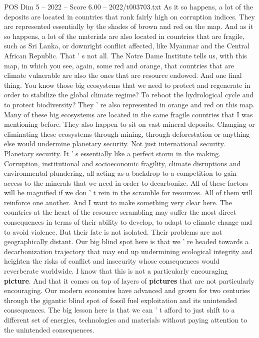 \begin{textsample}{POS Dim 5 – 2022 – Score 6.00 – 2022/t003703.txt}
As it so happens, a lot of the deposits are located in countries that rank fairly high on corruption indices.
They are represented essentially by the shades of brown and red on the map.
And as it so happens, a lot of the materials are also located in countries that are fragile, such as Sri Lanka, or downright conflict affected, like Myanmar and the Central African Republic.
That ' s not all.
The Notre Dame Institute tells us, with this map, in which you see, again, some red and orange, that countries that are climate vulnerable are also the ones that are resource endowed.
And one final thing.
You know those big ecosystems that we need to protect and regenerate in order to stabilize the global climate regime?
To reboot the hydrological cycle and to protect biodiversity?
They ' re also represented in orange and red on this map.
Many of these big ecosystems are located in the same fragile countries that I was mentioning before.
They also happen to sit on vast mineral deposits.
Changing or eliminating these ecosystems through mining, through deforestation or anything else would undermine planetary security.
Not just international security.
Planetary security.
It ' s essentially like a perfect storm in the making.
Corruption, institutional and socioeconomic fragility, climate disruptions and environmental plundering, all acting as a backdrop to a competition to gain access to the minerals that we need in order to decarbonize.
All of these factors will be magnified if we don ' t rein in the scramble for resources.
All of them will reinforce one another.
And I want to make something very clear here.
The countries at the heart of the resource scrambling may suffer the most direct consequences in terms of their ability to develop, to adapt to climate change and to avoid violence.
But their fate is not isolated.
Their problems are not geographically distant.
Our big blind spot here is that we ' re headed towards a decarbonization trajectory that may end up undermining ecological integrity and heighten the risks of conflict and insecurity whose consequences would reverberate worldwide.
I know that this is not a particularly encouraging \textbf{picture}.
And that it comes on top of layers of \textbf{pictures} that are not particularly encouraging.
Our modern economies have advanced and grown for two centuries through the gigantic blind spot of fossil fuel exploitation and its unintended consequences.
The big lesson here is that we can ' t afford to just shift to a different set of energies, technologies and materials without paying attention to the unintended consequences.

\end{textsample}
